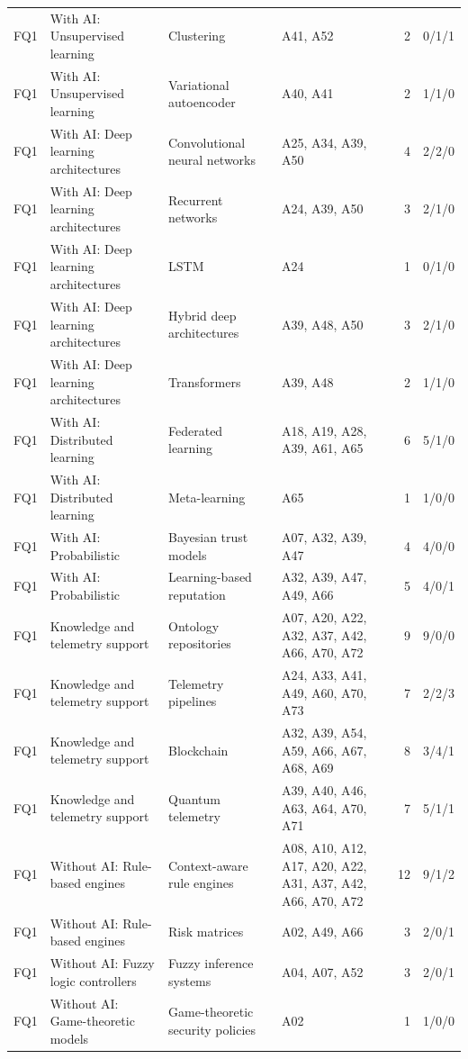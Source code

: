 {\begin{footnotesize}
\begin{longtable}{p{0.63cm}p{2.83cm}p{2.67cm}p{5.19cm}rp{1.26cm}}
FQ1 & With AI: Unsupervised learning & Clustering & A41, A52 & 2 & 0/1/1 \\
FQ1 & With AI: Unsupervised learning & Variational autoencoder & A40, A41 & 2 & 1/1/0 \\
FQ1 & With AI: Deep learning architectures & Convolutional neural networks & A25, A34, A39, A50 & 4 & 2/2/0 \\
FQ1 & With AI: Deep learning architectures & Recurrent networks & A24, A39, A50 & 3 & 2/1/0 \\
FQ1 & With AI: Deep learning architectures & LSTM & A24 & 1 & 0/1/0 \\
FQ1 & With AI: Deep learning architectures & Hybrid deep architectures & A39, A48, A50 & 3 & 2/1/0 \\
FQ1 & With AI: Deep learning architectures & Transformers & A39, A48 & 2 & 1/1/0 \\
FQ1 & With AI: Distributed learning & Federated learning & A18, A19, A28, A39, A61, A65 & 6 & 5/1/0 \\
FQ1 & With AI: Distributed learning & Meta-learning & A65 & 1 & 1/0/0 \\
FQ1 & With AI: Probabilistic & Bayesian trust models & A07, A32, A39, A47 & 4 & 4/0/0 \\
FQ1 & With AI: Probabilistic & Learning-based reputation & A32, A39, A47, A49, A66 & 5 & 4/0/1 \\
FQ1 & Knowledge and telemetry support & Ontology repositories & A07, A20, A22, A32, A37, A42, A66, A70, A72 & 9 & 9/0/0 \\
FQ1 & Knowledge and telemetry support & Telemetry pipelines & A24, A33, A41, A49, A60, A70, A73 & 7 & 2/2/3 \\
FQ1 & Knowledge and telemetry support & Blockchain & A32, A39, A54, A59, A66, A67, A68, A69 & 8 & 3/4/1 \\
FQ1 & Knowledge and telemetry support & Quantum telemetry & A39, A40, A46, A63, A64, A70, A71 & 7 & 5/1/1 \\
FQ1 & Without AI: Rule-based engines & Context-aware rule engines & A08, A10, A12, A17, A20, A22, A31, A37, A42, A66, A70, A72 & 12 & 9/1/2 \\
FQ1 & Without AI: Rule-based engines & Risk matrices & A02, A49, A66 & 3 & 2/0/1 \\
FQ1 & Without AI: Fuzzy logic controllers & Fuzzy inference systems & A04, A07, A52 & 3 & 2/0/1 \\
FQ1 & Without AI: Game-theoretic models & Game-theoretic security policies & A02 & 1 & 1/0/0 \\

\end{longtable}
\end{footnotesize}}
